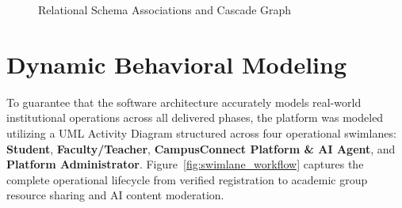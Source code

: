 \documentclass[12pt, a4paper, oneside]{report}
\begin{document}
\begin{figure}[H]
{
}
\caption{Relational Schema Associations and Cascade Graph}
\label{fig:erd_core}
\end{figure}

\section{Dynamic Behavioral Modeling}
To guarantee that the software architecture accurately models real-world institutional operations across all delivered phases, the platform was modeled utilizing a UML Activity Diagram structured across four operational swimlanes: \textbf{Student}, \textbf{Faculty/Teacher}, \textbf{CampusConnect Platform \& AI Agent}, and \textbf{Platform Administrator}. Figure~\ref{fig:swimlane_workflow} captures the complete operational lifecycle from verified registration to academic group resource sharing and AI content moderation.
\end{document}
